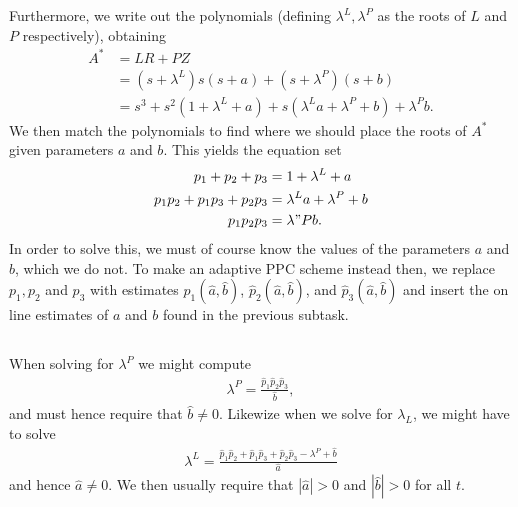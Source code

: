 \documentclass[]{article}
\begin{document}
Furthermore, we write out the polynomials (defining $\lambda^L, \lambda^P$ as the roots of $L$ and $P$ respectively), obtaining
\begin{equation}\begin{aligned}
A^* &= LR + PZ \\
&= (s + \lambda^L)s(s+a) + (s+\lambda^P)(s+b) \\
&= s^3 + s^2(1 + \lambda^L + a) + s(\lambda^L a + \lambda^P + b) + \lambda^P b.
\end{aligned}\end{equation}
We then match the polynomials to find where we should place the roots of $A^*$ given parameters $a$ and $b$. This yields the equation set
\begin{equation}\begin{aligned}
p_1 + p_2 + p_3 &= 1 + \lambda^L + a \\
p_1 p_2 + p_1 p_3 + p_2 p_3 &= \lambda^L a + \lambda^P + b\\
p_1 p_2 p_3 &= \lambda"P b.
\end{aligned}\end{equation}
In order to solve this, we must of course know the values of the parameters $a$ and $b$, which we do not. To make an adaptive PPC scheme instead then, we replace $p_1, p_2$ and $p_3$ with estimates $\hat p_1(\hat a, \hat b)$, $\hat p_2(\hat a, \hat b)$, and $\hat p_3(\hat a, \hat b)$ and insert the on line estimates of $a$ and $b$ found in the previous subtask.

\subsection{}
When solving for $\lambda^P$ we might compute
\begin{equation}\begin{aligned}
\lambda^P = \frac{\hat p_1 \hat p_2 \hat p_3}{\hat b},
\end{aligned}\end{equation}
and must hence require that $\hat b \neq 0$. Likewize when we solve for $\lambda_L$, we might have to solve
\begin{equation}\begin{aligned}
\lambda^L = \frac{\hat p_1 \hat p_2 + \hat p_1 \hat p_3  + \hat p_2 \hat p_3 - \lambda^P + \hat b}{\hat a}
\end{aligned}\end{equation}
and hence $\hat a \neq 0$. We then usually require that $|\hat a| > 0$ and $|\hat b| > 0$ for all $t$.
\end{document}
